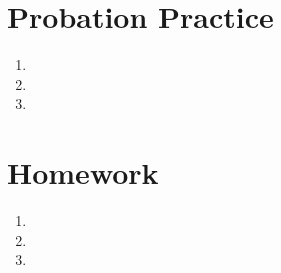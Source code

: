 \documentclass{article}
\title{\titleme}
\author{\authorme}
\begin{document}
\maketitle

\section*{Probation Practice}
\begin{enumerate}
    \item 
    \item 
    \item 
\end{enumerate}


\section*{Homework}
\begin{enumerate}
    \item 
    \item 
    \item 
\end{enumerate}
\end{document}
